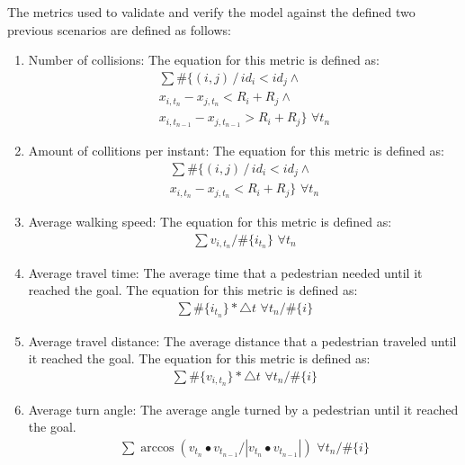 \documentclass[english]{article}
\begin{document}
The metrics used to validate and verify the model against the defined
two previous scenarios are defined as follows:
\begin{enumerate}
\item Number of collisions: The equation for this metric is defined as:
\\
 
\begin{eqnarray*}
    \sum\#\{(i,j)\,/\, id_{i}<id_{j}\wedge\\
    x_{i,t_{n}}-x_{j,t_{n}}<R_{i}+R_{j}\wedge\\
    x_{i,t_{n-1}}-x_{j,t_{n-1}}>R_{i}+R_{j}\}\,\,\forall t_{n}
\end{eqnarray*}

\item Amount of collitions per instant: The equation for this metric is
defined as: \\
 
\begin{eqnarray*}
    \sum\#\{(i,j)\,/\, id_{i}<id_{j}\wedge\\
    x_{i,t_{n}}-x_{j,t_{n}}<R_{i}+R_{j}\}\,\,\forall t_{n}
\end{eqnarray*}

\item Average walking speed: The equation for this metric is defined as:
\\
 
\begin{eqnarray*}
    \sum v_{i,t_{n}}/\#\{i_{t_{n}}\}\,\,\forall t_{n}
\end{eqnarray*}

\item Average travel time: The average time that a pedestrian needed until
it reached the goal. The equation for this metric is defined as: \\
 
\begin{eqnarray*}
\sum\#\{i_{t_{n}}\}*\triangle t\,\,\forall t_{n}/\#\{i\}
\end{eqnarray*}

\item Average travel distance: The average distance that a pedestrian traveled
until it reached the goal. The equation for this metric is defined
as: \\
 
\begin{eqnarray*}
\sum\#\{v_{i,t_{n}}\}*\triangle t\,\,\forall t_{n}/\#\{i\}
\end{eqnarray*}

\item Average turn angle: The average angle turned by a pedestrian until
it reached the goal.\\
 
\begin{eqnarray*}
    \sum\arccos(v_{t_{n}}\bullet v_{t_{n-1}}/|v_{t_{n}}\bullet v_{t_{n-1}}|)\,\,\forall t_{n}/\#\{i\}
\end{eqnarray*}

\end{enumerate}
\end{document}
